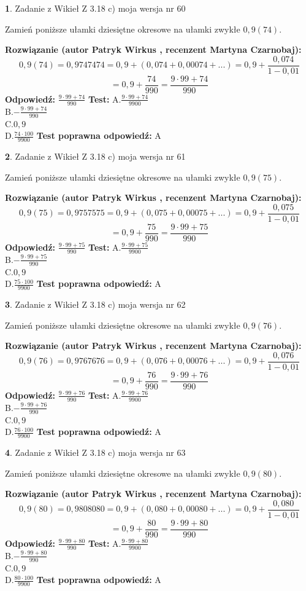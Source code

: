 \documentclass[12pt, a4paper]{article}
\theoremstyle{definition} %
\newtheorem{zad}{}
\newcommand{\zadStart}[1]{\begin{zad}#1\newline}
\newcommand{\zadStop}{\end{zad}}
\newcommand{\rozwStart}[2]{\noindent \textbf{Rozwiązanie (autor #1 , recenzent #2): }\newline}
\newcommand{\rozwStop}{\newline}
\newcommand{\odpStart}{\noindent \textbf{Odpowiedź:}\newline}
\newcommand{\odpStop}{\newline}
\newcommand{\testStart}{\noindent \textbf{Test:}\newline}
\newcommand{\testStop}{\newline}
\newcommand{\kluczStart}{\noindent \textbf{Test poprawna odpowiedź:}\newline}
\newcommand{\kluczStop}{\newline}
\begin{document}
\zadStart{Zadanie z Wikieł Z 3.18 c) moja wersja nr 60}

Zamień poniższe ułamki dziesiętne okresowe na ułamki zwykłe $0,9(74)$.
\zadStop
\rozwStart{Patryk Wirkus}{Martyna Czarnobaj}
$$0,9(74)=0,9747474=0,9+(0,074+0,00074+...)=0,9+\frac{0,074}{1-0,01}$$
$$=0,9+\frac{74}{990}=\frac{9\cdot99+74}{990}$$
\rozwStop
\odpStart
$\frac{9\cdot99+74}{990}$
\odpStop
\testStart
A.$\frac{9\cdot99+74}{9900}$\\ B.$-\frac{9\cdot99+74}{990}$\\ C.$0,9$\\ D.$\frac{74\cdot100}{9900}$
\testStop
\kluczStart
A
\kluczStop



\zadStart{Zadanie z Wikieł Z 3.18 c) moja wersja nr 61}

Zamień poniższe ułamki dziesiętne okresowe na ułamki zwykłe $0,9(75)$.
\zadStop
\rozwStart{Patryk Wirkus}{Martyna Czarnobaj}
$$0,9(75)=0,9757575=0,9+(0,075+0,00075+...)=0,9+\frac{0,075}{1-0,01}$$
$$=0,9+\frac{75}{990}=\frac{9\cdot99+75}{990}$$
\rozwStop
\odpStart
$\frac{9\cdot99+75}{990}$
\odpStop
\testStart
A.$\frac{9\cdot99+75}{9900}$\\ B.$-\frac{9\cdot99+75}{990}$\\ C.$0,9$\\ D.$\frac{75\cdot100}{9900}$
\testStop
\kluczStart
A
\kluczStop



\zadStart{Zadanie z Wikieł Z 3.18 c) moja wersja nr 62}

Zamień poniższe ułamki dziesiętne okresowe na ułamki zwykłe $0,9(76)$.
\zadStop
\rozwStart{Patryk Wirkus}{Martyna Czarnobaj}
$$0,9(76)=0,9767676=0,9+(0,076+0,00076+...)=0,9+\frac{0,076}{1-0,01}$$
$$=0,9+\frac{76}{990}=\frac{9\cdot99+76}{990}$$
\rozwStop
\odpStart
$\frac{9\cdot99+76}{990}$
\odpStop
\testStart
A.$\frac{9\cdot99+76}{9900}$\\ B.$-\frac{9\cdot99+76}{990}$\\ C.$0,9$\\ D.$\frac{76\cdot100}{9900}$
\testStop
\kluczStart
A
\kluczStop



\zadStart{Zadanie z Wikieł Z 3.18 c) moja wersja nr 63}

Zamień poniższe ułamki dziesiętne okresowe na ułamki zwykłe $0,9(80)$.
\zadStop
\rozwStart{Patryk Wirkus}{Martyna Czarnobaj}
$$0,9(80)=0,9808080=0,9+(0,080+0,00080+...)=0,9+\frac{0,080}{1-0,01}$$
$$=0,9+\frac{80}{990}=\frac{9\cdot99+80}{990}$$
\rozwStop
\odpStart
$\frac{9\cdot99+80}{990}$
\odpStop
\testStart
A.$\frac{9\cdot99+80}{9900}$\\ B.$-\frac{9\cdot99+80}{990}$\\ C.$0,9$\\ D.$\frac{80\cdot100}{9900}$
\testStop
\kluczStart
A
\kluczStop
\end{document}
